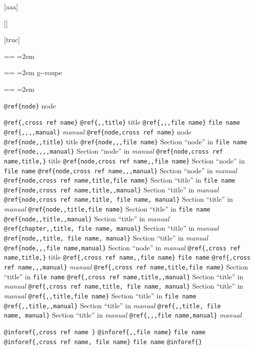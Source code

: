 \documentclass{book}
\makeatletter
\newenvironment{GNUTexinfopreformatted}{%
  \par\obeylines\obeyspaces\frenchspacing
  \parskip=\z@\parindent=\z@}{}
\makeatother
\begin{document}
\noindent\texttt{}\hfill[aaa]

\noindent\texttt{}\hfill[]

\noindent\texttt{}\hfill[truc]

\begin{GNUTexinfopreformatted}
\leftskip=2em\relax\ttfamily%

\end{GNUTexinfopreformatted}
\begin{GNUTexinfopreformatted}
\leftskip=2em\relax\ttfamily%
g{-}{-}roupe
\end{GNUTexinfopreformatted}
\begin{GNUTexinfopreformatted}
\leftskip=2em\relax\ttfamily%

\texttt{@ref\{node\}} node

\texttt{@ref\{,cross ref name\}} 
\texttt{@ref\{{,}{,}title\}} title
\texttt{@ref\{{,}{,},file name\}} \texttt{file name}
\texttt{@ref\{{,}{,}{,}{,}manual\}} \textsl{manual}
\texttt{@ref\{node,cross ref name\}} node
\texttt{@ref\{node{,}{,}title\}} title
\texttt{@ref\{node{,}{,},file name\}} Section ``node'' in \texttt{file name}
\texttt{@ref\{node{,}{,}{,}{,}manual\}} Section ``node'' in \textsl{manual}
\texttt{@ref\{node,cross ref name,title,\}} title
\texttt{@ref\{node,cross ref name{,}{,}file name\}} Section ``node'' in \texttt{file name}
\texttt{@ref\{node,cross ref name{,}{,},manual\}} Section ``node'' in \textsl{manual}
\texttt{@ref\{node,cross ref name,title,file name\}} Section ``title'' in \texttt{file name}
\texttt{@ref\{node,cross ref name,title{,}{,}manual\}} Section ``title'' in \textsl{manual}
\texttt{@ref\{node,cross ref name,title,\ file name,\ manual\}} Section ``title'' in \textsl{manual}
\texttt{@ref\{node{,}{,}title,file name\}} Section ``title'' in \texttt{file name}
\texttt{@ref\{node{,}{,}title{,}{,}manual\}} Section ``title'' in \textsl{manual}
\texttt{@ref\{chapter{,}{,}title,\ file name,\ manual\}} Section ``title'' in \textsl{manual}
\texttt{@ref\{node{,}{,}title,\ file name,\ manual\}} Section ``title'' in \textsl{manual}
\texttt{@ref\{node{,}{,},file name,manual\}} Section ``node'' in \textsl{manual}
\texttt{@ref\{,cross ref name,title,\}} title
\texttt{@ref\{,cross ref name{,}{,}file name\}} \texttt{file name}
\texttt{@ref\{,cross ref name{,}{,},manual\}} \textsl{manual}
\texttt{@ref\{,cross ref name,title,file name\}} Section ``title'' in \texttt{file name}
\texttt{@ref\{,cross ref name,title{,}{,}manual\}} Section ``title'' in \textsl{manual}
\texttt{@ref\{,cross ref name,title,\ file name,\ manual\}} Section ``title'' in \textsl{manual}
\texttt{@ref\{{,}{,}title,file name\}} Section ``title'' in \texttt{file name}
\texttt{@ref\{{,}{,}title{,}{,}manual\}} Section ``title'' in \textsl{manual}
\texttt{@ref\{{,}{,}title,\ file name,\ manual\}} Section ``title'' in \textsl{manual}
\texttt{@ref\{{,}{,},file name,manual\}} \textsl{manual}

\texttt{@inforef\{,cross ref name \}} 
\texttt{@inforef\{{,}{,}file name\}} \texttt{file name}
\texttt{@inforef\{,cross ref name,\ file name\}} \texttt{file name}
\texttt{@inforef\{\}} 


\end{GNUTexinfopreformatted}
\end{document}
